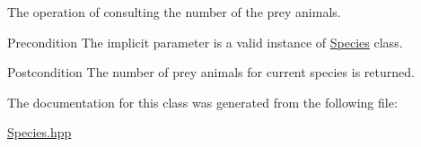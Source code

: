 The operation of consulting the number of the prey animals. 

\begin{DoxyPrecond}{Precondition}
The implicit parameter is a valid instance of \hyperlink{class_species}{Species} class. 
\end{DoxyPrecond}
\begin{DoxyPostcond}{Postcondition}
The number of prey animals for current species is returned. 
\end{DoxyPostcond}


The documentation for this class was generated from the following file\-:\begin{DoxyCompactItemize}
\item 
\hyperlink{_species_8hpp}{Species.\-hpp}\end{DoxyCompactItemize}
